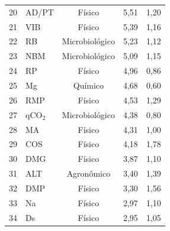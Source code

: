 \documentclass[12pt]{article}
\begin{document}
\begin{table}[ht]
\begin{tabular}{rlccc}
20 & AD/PT & Físico          & 5,51 & 1,20 \\
21 & VIB   & Físico          & 5,39 & 1,16 \\
22 & RB    & Microbiológico  & 5,23 & 1,12 \\
23 & NBM   & Microbiológico  & 5,09 & 1,15 \\
24 & RP    & Físico          & 4,96 & 0,86 \\
25 & Mg    & Químico         & 4,68 & 0,60 \\
26 & RMP   & Físico          & 4,53 & 1,29 \\
27 & qCO$_2$  & Microbiológico & 4,38 & 0,80 \\
28 & MA    & Físico          & 4,31 & 1,00 \\
29 & COS   & Físico          & 4,18 & 1,78 \\
30 & DMG   & Físico          & 3,87 & 1,10 \\
31 & ALT   & Agronômico      & 3,40 & 1,39 \\
32 & DMP   & Físico          & 3,30 & 1,56 \\
33 & Na    & Físico          & 2,97 & 1,10 \\
34 & Ds    & Físico          & 2,95 & 1,05 \\
\bottomrule
\end{tabular}
\smallskip

\end{table}
\end{document}
